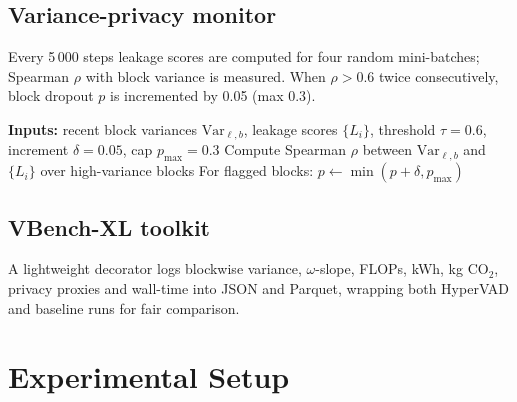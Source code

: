 \documentclass{article}
\begin{document}
\subsection{Variance-privacy monitor}
Every 5\,000 steps leakage scores are computed for four random mini-batches; Spearman $\rho$ with block variance is measured. When $\rho > 0.6$ twice consecutively, block dropout $p$ is incremented by 0.05 (max 0.3).

\begin{algorithm}[t]
\caption{Variance-driven privacy sentinel}
\begin{algorithmic}[1]
\State \textbf{Inputs:} recent block variances $\mathrm{Var}_{\ell,b}$, leakage scores $\{L_i\}$, threshold $\tau=0.6$, increment $\delta=0.05$, cap $p_{\max}=0.3$
\State Compute Spearman $\rho$ between $\mathrm{Var}_{\ell,b}$ and $\{L_i\}$ over high-variance blocks
  \State For flagged blocks: $p \leftarrow \min(p + \delta, p_{\max})$
\EndIf
\end{algorithmic}
\end{algorithm}

\subsection{VBench-XL toolkit}
A lightweight decorator logs blockwise variance, $\omega$-slope, FLOPs, kWh, kg CO$_2$, privacy proxies and wall-time into JSON and Parquet, wrapping both HyperVAD and baseline runs for fair comparison.

\section{Experimental Setup}
\end{document}
